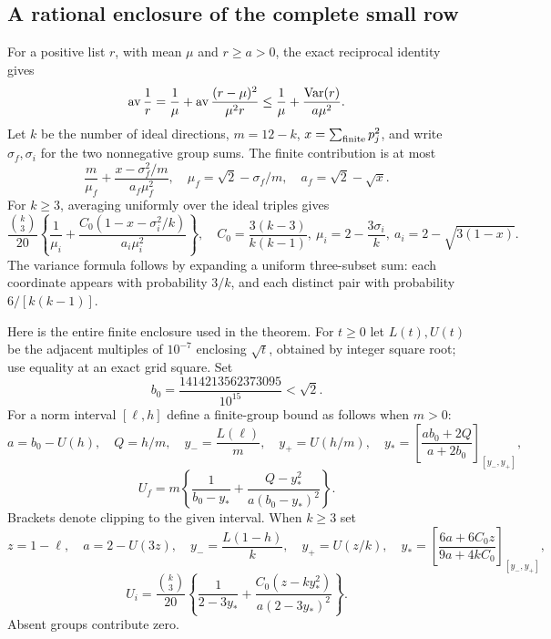 \documentclass[11pt]{article}
\theoremstyle{definition}\newtheorem{definition}[theorem]{Definition}
\theoremstyle{remark}\newtheorem{remark}[theorem]{Remark}
\newcommand{\bin}[2]{\binom{#1}{#2}}
\begin{document}
\subsection{A rational enclosure of the complete small row}
For a positive list \(r\), with mean \(\mu\) and \(r\ge a>0\),
the exact reciprocal identity gives
\begin{equation}\label{eq:moment1}
 \mathop{\rm av}\frac1r
 =\frac1\mu+\mathop{\rm av}\frac{(r-\mu)^2}{\mu^2r}
 \le\frac1\mu+\frac{\operatorname{Var}(r)}{a\mu^2}.
\end{equation}
Let \(k\) be the number of ideal directions, \(m=12-k\),
\(x=\sum_{\rm finite}p_j^2\), and write \(\sigma_f,\sigma_i\)
for the two nonnegative group sums. The finite contribution is at most
\begin{equation}\label{eq:finrow}
 \frac m{\mu_f}+\frac{x-\sigma_f^2/m}{a_f\mu_f^2},
 \quad \mu_f=\sqrt2-\sigma_f/m,\quad a_f=\sqrt2-\sqrt{x}.
\end{equation}
For \(k\ge3\), averaging uniformly over the ideal triples gives
\begin{equation}\label{eq:idealrow}
 \frac{\bin{k}{3}}{20}\left\{
 \frac1{\mu_i}+\frac{C_0(1-x-\sigma_i^2/k)}{a_i\mu_i^2}\right\},
 \quad C_0=\frac{3(k-3)}{k(k-1)},\
 \mu_i=2-\frac{3\sigma_i}k,\
 a_i=2-\sqrt{3(1-x)}.
\end{equation}
The variance formula follows by expanding a uniform three-subset sum:
each coordinate appears with probability \(3/k\), and each distinct
pair with probability \(6/[k(k-1)]\).

Here is the entire finite enclosure used in the theorem. For \(t\ge0\)
let \(L(t),U(t)\) be the adjacent multiples of \(10^{-7}\) enclosing
\(\sqrt t\), obtained by integer square root; use equality at an exact
grid square. Set
\[
 b_0=\frac{1414213562373095}{10^{15}}<\sqrt2.
\]
For a norm interval \([\ell,h]\) define a finite-group bound as follows
when \(m>0\):
\[
 a=b_0-U(h),\quad Q=h/m,\quad
 y_-=\frac{L(\ell)}m,\quad y_+=U(h/m),\quad
 y_*=\left[\frac{ab_0+2Q}{a+2b_0}\right]_{[y_-,y_+]},
\]
\begin{equation}\label{eq:certF}
 U_f=m\left\{\frac1{b_0-y_*}
       +\frac{Q-y_*^2}{a(b_0-y_*)^2}\right\}.
\end{equation}
Brackets denote clipping to the given interval. When \(k\ge3\) set
\[
 z=1-\ell,\quad a=2-U(3z),\quad
 y_-=\frac{L(1-h)}k,\quad y_+=U(z/k),\quad
 y_*=\left[\frac{6a+6C_0z}{9a+4kC_0}\right]_{[y_-,y_+]},
\]
\begin{equation}\label{eq:certI}
 U_i=\frac{\bin{k}{3}}{20}
 \left\{\frac1{2-3y_*}+
       \frac{C_0(z-ky_*^2)}{a(2-3y_*)^2}\right\}.
\end{equation}
Absent groups contribute zero.
\end{document}
